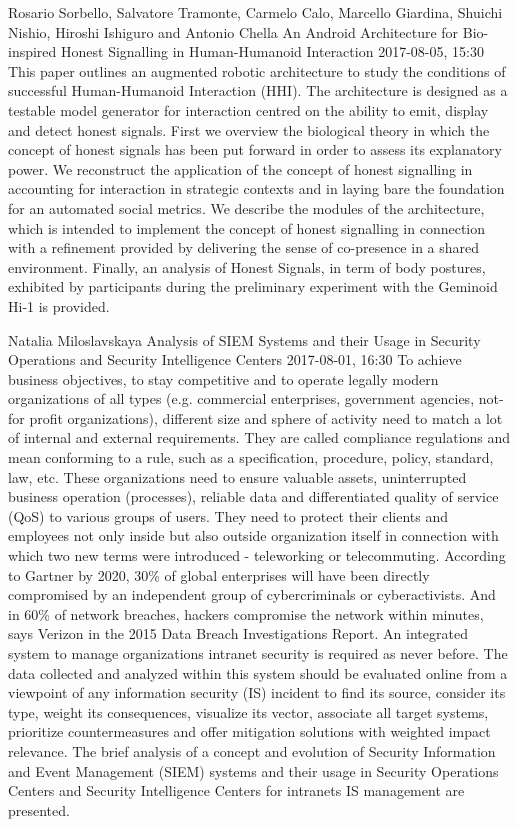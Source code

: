\documentclass[10pt,fleqn,openany]{book} %
\begin{document}
\begin{enumerate}
	
	\paperabstract
	{Rosario Sorbello, Salvatore Tramonte, Carmelo Calo, Marcello Giardina, Shuichi Nishio, Hiroshi Ishiguro and Antonio Chella}
	{An Android Architecture for Bio-inspired Honest Signalling in Human-Humanoid Interaction}
	{2017-08-05, 15:30}
	{This paper outlines an augmented robotic architecture to study the conditions of successful Human-Humanoid Interaction (HHI). The architecture is designed as a testable model generator for interaction centred on the ability to emit, display and detect honest signals. First we overview the biological theory in which the concept of honest signals has been put forward in order to assess its explanatory power. We reconstruct the application of the concept of honest signalling in accounting for interaction in strategic contexts and in laying bare the foundation for an automated social metrics. We describe the modules of the architecture, which is intended to implement the concept of honest signalling in connection with a refinement provided by delivering the sense of co-presence in a shared environment. Finally, an analysis of Honest Signals, in term of body postures, exhibited by participants during the preliminary experiment with the Geminoid Hi-1 is provided.}
	
	
	\paperabstract
	{Natalia Miloslavskaya}
	{Analysis of SIEM Systems and their Usage in Security Operations and Security Intelligence Centers}
	{2017-08-01, 16:30}
	{To achieve business objectives, to stay competitive and to operate legally modern organizations of all types (e.g. commercial enterprises, government agencies, not-for profit organizations), different size and sphere of activity need to match a lot of internal and external requirements. They are called compliance regulations and mean conforming to a rule, such as a specification, procedure, policy, standard, law, etc. These organizations need to ensure valuable assets, uninterrupted business operation (processes), reliable data and differentiated quality of service (QoS) to various groups of users. They need to protect their clients and employees not only inside but also outside organization itself in connection with which two new terms were introduced - teleworking or telecommuting. According to Gartner by 2020, 30\% of global enterprises will have been directly compromised by an independent group of cybercriminals or cyberactivists. And in 60\% of network breaches, hackers compromise the network within minutes, says Verizon in the 2015 Data Breach Investigations Report. An integrated system to manage organizations intranet security is required as never before. The data collected and analyzed within this system should be evaluated online from a viewpoint of any information security (IS) incident to find its source, consider its type, weight its consequences, visualize its vector, associate all target systems, prioritize countermeasures and offer mitigation solutions with weighted impact relevance. The brief analysis of a concept and evolution of Security Information and Event Management (SIEM) systems and their usage in Security Operations Centers and Security Intelligence Centers for intranets IS management are presented.}
		

\end{enumerate}
\end{document}
